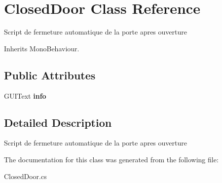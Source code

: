 \hypertarget{class_closed_door}{\section{Closed\+Door Class Reference}
\label{class_closed_door}
}


Script de fermeture automatique de la porte apres ouverture  




Inherits Mono\+Behaviour.

\subsection*{Public Attributes}
\begin{DoxyCompactItemize}
\item 
\hypertarget{class_closed_door_ab3a0b59b06e7fd2c86a3402de299ac7a}{G\+U\+I\+Text {\bfseries info}}\label{class_closed_door_ab3a0b59b06e7fd2c86a3402de299ac7a}

\end{DoxyCompactItemize}


\subsection{Detailed Description}
Script de fermeture automatique de la porte apres ouverture 



The documentation for this class was generated from the following file\+:\begin{DoxyCompactItemize}
\item 
Closed\+Door.\+cs\end{DoxyCompactItemize}
